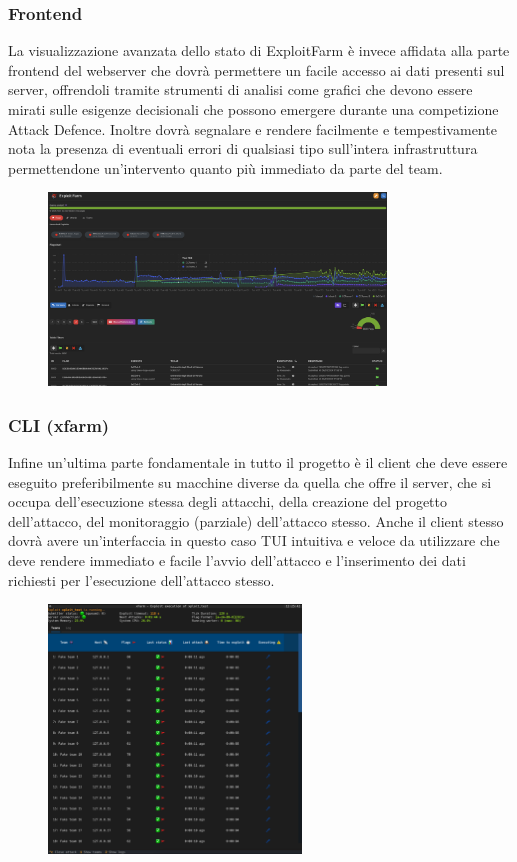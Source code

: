 \documentclass[11pt]{article}
\begin{document}
\subsubsection{Frontend}
La visualizzazione avanzata dello stato di ExploitFarm è invece affidata alla parte frontend del webserver che dovrà permettere un facile accesso ai dati presenti sul server, offrendoli tramite strumenti di analisi come grafici che devono essere mirati sulle esigenze decisionali che possono emergere durante una competizione Attack Defence. Inoltre dovrà segnalare e rendere facilmente e tempestivamente nota la presenza di eventuali errori di qualsiasi tipo sull'intera infrastruttura permettendone un'intervento quanto più immediato da parte del team.
    \begin{figure}[H]
    	\centering
    	\includegraphics[width=0.8\textwidth]{exploitfarm-web.png}
	\end{figure}
\subsubsection{CLI (xfarm)}
Infine un'ultima parte fondamentale in tutto il progetto è il client che deve essere eseguito preferibilmente su macchine diverse da quella che offre il server, che si occupa dell'esecuzione stessa degli attacchi, della creazione del progetto dell'attacco, del monitoraggio (parziale) dell'attacco stesso. Anche il client stesso dovrà avere un'interfaccia in questo caso TUI intuitiva e veloce da utilizzare che deve rendere immediato e facile l'avvio dell'attacco e l'inserimento dei dati richiesti per l'esecuzione dell'attacco stesso.
    \begin{figure}[H]
    	\centering
    	\includegraphics[width=0.6\textwidth]{xfarm-start-cmd.png}
	\end{figure}
\end{document}
